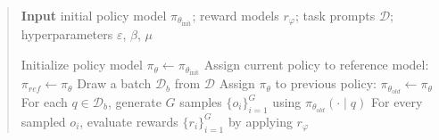 \begin{abstract}
\begin{itemize}[topsep=0pt]
\begin{algorithm}[t]
  \small
  \caption{Iterative Group Relative Policy Optimization}
  \textbf{Input} initial policy model $\pi_{\theta_{\text{init}}}$; reward models $r_\varphi$; task prompts $\mathcal{D}$; 
  hyperparameters $\varepsilon$, $\beta$, $\mu$
  \begin{algorithmic}[1]
    \State Initialize policy model $\pi_\theta \leftarrow \pi_{\theta_{\text{init}}}$
       \State Assign current policy to reference model: $\pi_{ref} \leftarrow \pi_{\theta}$
      \State Draw a batch $\mathcal{D}_b$ from $\mathcal{D}$
      \State Assign $\pi_{\theta}$ to previous policy: $\pi_{\theta_{old}} \leftarrow \pi_{\theta}$ 
      \State For each $q \in \mathcal{D}_b$, generate $G$ samples $\{o_i\}_{i=1}^G$ using $\pi_{\theta_{old}} (\cdot \mid q) $
      \State For every sampled $o_i$, evaluate rewards $\{r_i\}_{i=1}^{G}$ by applying $r_{\varphi}$ 

\end{algorithmic}
\end{algorithm}
\end{itemize}
\end{abstract}
